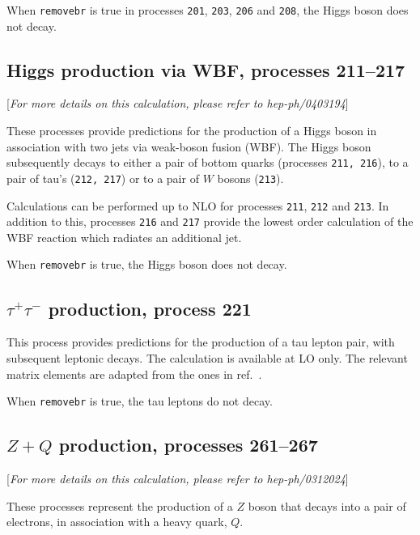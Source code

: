 \documentclass[12pt]{article}
\begin{document}
When {\tt removebr} is true in processes {\tt 201}, {\tt 203}, {\tt 206}
and {\tt 208}, the Higgs boson does not decay.

\subsection{Higgs production via WBF, processes 211--217}
\label{subsec:wbf}

\begin{center}
[{\it For more details on this calculation, please refer to hep-ph/0403194}]
\end{center}

These processes provide predictions for the production of a Higgs boson in
association with two jets via weak-boson fusion (WBF). The Higgs boson
subsequently decays to either a pair of bottom quarks
(processes {\tt 211, 216}), to a pair of tau's ({\tt 212, 217}) or to
a pair of $W$ bosons ({\tt 213}).

Calculations can be performed up to NLO for processes {\tt 211}, {\tt 212} and {\tt 213}.
In addition to this, processes {\tt 216} and {\tt 217} provide the lowest
order calculation of the WBF reaction which radiates an additional jet. 

When {\tt removebr} is true, the Higgs boson does not decay.

\subsection{$\tau^+\tau^-$ production, process 221}
\label{subsec:tautau}

This process provides predictions for the production of a tau lepton
pair, with subsequent leptonic decays. The calculation is available at LO
only. The relevant matrix elements are adapted from the ones in
ref.~\cite{Kleiss:1988xr}.

When {\tt removebr} is true, the tau leptons do not decay.

\subsection{$Z+Q$ production, processes 261--267}
\label{subsec:ZQ}

\begin{center}
[{\it For more details on this calculation, please refer to hep-ph/0312024}]
\end{center}

These processes represent the production of a $Z$
boson that decays into a pair of electrons,
in association with a heavy quark, $Q$.
\end{document}
